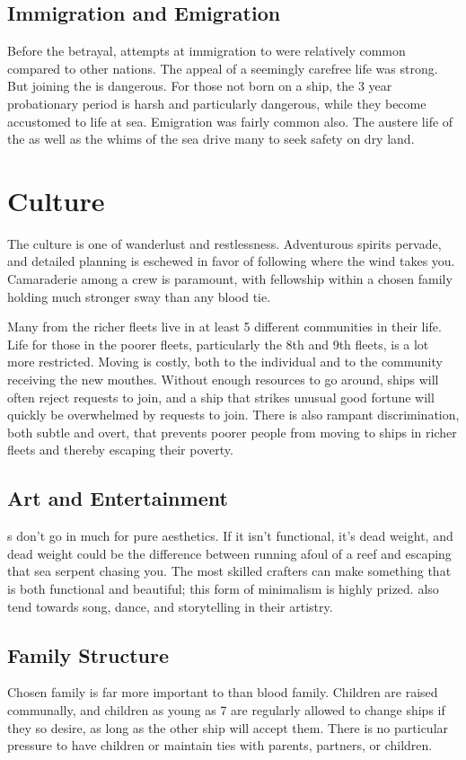 \documentclass[blue]{GL2020}
\begin{document}
\subsection*{Immigration and Emigration}
Before the betrayal, attempts at immigration to \pShip{} were relatively common compared to other nations. The appeal of a seemingly carefree life was strong. But joining the \pShippies{} is dangerous. For those not born on a ship, the 3 year probationary period is harsh and particularly dangerous, while they become accustomed to life at sea. Emigration was fairly common also. The austere life of the \pShip{} as well as the whims of the sea drive many to seek safety on dry land.

\section*{Culture}
The \pShip{} culture is one of wanderlust and restlessness. Adventurous spirits pervade, and detailed planning is eschewed in favor of following where the wind takes you. Camaraderie among a crew is paramount, with fellowship within a chosen family holding much stronger sway than any blood tie.

Many \pShippies{} from the richer fleets live in at least 5 different communities in their life. Life for those in the poorer fleets, particularly the 8th and 9th fleets, is a lot more restricted. Moving is costly, both to the individual and to the community receiving the new mouthes. Without enough resources to go around, ships will often reject requests to join, and a ship that strikes unusual good fortune will quickly be overwhelmed by requests to join. There is also rampant discrimination, both subtle and overt, that prevents poorer people from moving to ships in richer fleets and thereby escaping their poverty.

\subsection{Art and Entertainment}
\pShippies{}s don't go in much for pure aesthetics. If it isn't functional, it's dead weight, and dead weight could be the difference between running afoul of a reef and escaping that sea serpent chasing you. The most skilled crafters can make something that is both functional and beautiful; this form of minimalism is highly prized. \pShippies{} also tend towards song, dance, and storytelling in their artistry.

\subsection*{Family Structure}
Chosen family is far more important to \pShippies{} than blood family. Children are raised communally, and children as young as 7 are regularly allowed to change ships if they so desire, as long as the other ship will accept them. There is no particular pressure to have children or maintain ties with parents, partners, or children.
\end{document}
